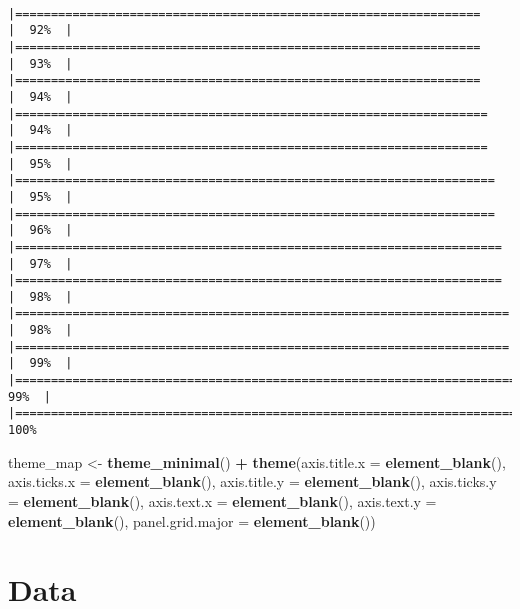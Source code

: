 \documentclass[12pt,twoside]{reedthesis}
\newenvironment{Shaded}{\begin{snugshade}}{\end{snugshade}}
\newcommand{\DataTypeTok}[1]{\textcolor[rgb]{0.13,0.29,0.53}{#1}}
\newcommand{\KeywordTok}[1]{\textcolor[rgb]{0.13,0.29,0.53}{\textbf{#1}}}
\newcommand{\NormalTok}[1]{#1}
\newcommand{\OperatorTok}[1]{\textcolor[rgb]{0.81,0.36,0.00}{\textbf{#1}}}
\newcommand{\StringTok}[1]{\textcolor[rgb]{0.31,0.60,0.02}{#1}}
\begin{document}
\begin{verbatim}
                                                                      |=================================================================     |  92%  |                                                                              |=================================================================     |  93%  |                                                                              |=================================================================     |  94%  |                                                                              |==================================================================    |  94%  |                                                                              |==================================================================    |  95%  |                                                                              |===================================================================   |  95%  |                                                                              |===================================================================   |  96%  |                                                                              |====================================================================  |  97%  |                                                                              |====================================================================  |  98%  |                                                                              |===================================================================== |  98%  |                                                                              |===================================================================== |  99%  |                                                                              |======================================================================|  99%  |                                                                              |======================================================================| 100%
\end{verbatim}
\begin{Shaded}
\begin{Highlighting}[]
\NormalTok{theme_map <-}\StringTok{ }\KeywordTok{theme_minimal}\NormalTok{() }\OperatorTok{+}
\StringTok{  }\KeywordTok{theme}\NormalTok{(}\DataTypeTok{axis.title.x =} \KeywordTok{element_blank}\NormalTok{(),}
        \DataTypeTok{axis.ticks.x =} \KeywordTok{element_blank}\NormalTok{(),}
        \DataTypeTok{axis.title.y =} \KeywordTok{element_blank}\NormalTok{(),}
        \DataTypeTok{axis.ticks.y =} \KeywordTok{element_blank}\NormalTok{(),}
        \DataTypeTok{axis.text.x =} \KeywordTok{element_blank}\NormalTok{(),}
        \DataTypeTok{axis.text.y =} \KeywordTok{element_blank}\NormalTok{(),}
        \DataTypeTok{panel.grid.major =} \KeywordTok{element_blank}\NormalTok{())}
\end{Highlighting}
\end{Shaded}
\hypertarget{data}{%
\chapter{Data}\label{data}}
\end{document}
